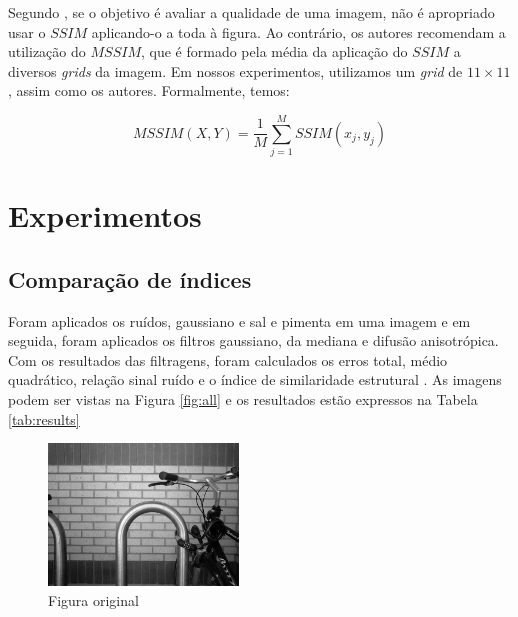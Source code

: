 \documentclass[10pt,a4paper]{article}
\begin{document}
Segundo \cite{article}, se o objetivo é avaliar a qualidade de uma imagem, não é apropriado usar o $\mathit{SSIM}$ aplicando-o a toda à figura. Ao contrário, os autores recomendam a utilização do $\mathit{MSSIM}$, que é formado pela média da aplicação do $\mathit{SSIM}$ a diversos \textit{grids} da imagem. Em nossos experimentos, utilizamos um \textit{grid} de $11 \times 11$, assim como os autores. Formalmente, temos:

\begin{equation}
    \mathit{MSSIM}(X,Y) = \frac{1}{M} \sum_{j=1}^M \mathit{SSIM}(x_j, y_j)
    \label{eq:mssim}
\end{equation}

\newpage

\section{Experimentos}
\subsection{Comparação de índices}
Foram aplicados os ruídos, gaussiano e sal e pimenta em uma imagem e em seguida, foram aplicados os filtros gaussiano, da mediana e difusão anisotrópica.
Com os resultados das filtragens, foram calculados os erros total, médio quadrático, relação sinal ruído e o índice de similaridade estrutural \cite{article}. As imagens podem ser vistas na Figura \ref{fig:all} e os resultados estão expressos na Tabela \ref{tab:results}
\begin{figure}[!ht]
    \centering
        \includegraphics[width=0.45\textwidth]{src.jpg}
        \caption{Figura original}
        \label{fig:src}
\end{figure}
\end{document}
